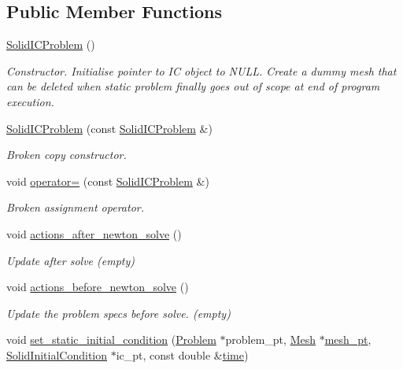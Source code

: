 \subsection*{Public Member Functions}
\begin{DoxyCompactItemize}
\item 
\hyperlink{classoomph_1_1SolidICProblem_ae1dd84a4e5df9eb444dd82531847ab79}{Solid\+I\+C\+Problem} ()
\begin{DoxyCompactList}\small\item\em Constructor. Initialise pointer to IC object to N\+U\+LL. Create a dummy mesh that can be deleted when static problem finally goes out of scope at end of program execution. \end{DoxyCompactList}\item 
\hyperlink{classoomph_1_1SolidICProblem_a2f8924f554988e4c9bb98281231f9767}{Solid\+I\+C\+Problem} (const \hyperlink{classoomph_1_1SolidICProblem}{Solid\+I\+C\+Problem} \&)
\begin{DoxyCompactList}\small\item\em Broken copy constructor. \end{DoxyCompactList}\item 
void \hyperlink{classoomph_1_1SolidICProblem_a109d2237cf87ebf19793e5088f89761f}{operator=} (const \hyperlink{classoomph_1_1SolidICProblem}{Solid\+I\+C\+Problem} \&)
\begin{DoxyCompactList}\small\item\em Broken assignment operator. \end{DoxyCompactList}\item 
void \hyperlink{classoomph_1_1SolidICProblem_afef1ae777a009afd2329dcb091862f69}{actions\+\_\+after\+\_\+newton\+\_\+solve} ()
\begin{DoxyCompactList}\small\item\em Update after solve (empty) \end{DoxyCompactList}\item 
void \hyperlink{classoomph_1_1SolidICProblem_ad234d3268b330cd2f532548103cb60fc}{actions\+\_\+before\+\_\+newton\+\_\+solve} ()
\begin{DoxyCompactList}\small\item\em Update the problem specs before solve. (empty) \end{DoxyCompactList}\item 
void \hyperlink{classoomph_1_1SolidICProblem_a60e1dccbc8627a07bfcb38a55b0669ca}{set\+\_\+static\+\_\+initial\+\_\+condition} (\hyperlink{classoomph_1_1Problem}{Problem} $\ast$problem\+\_\+pt, \hyperlink{classoomph_1_1Mesh}{Mesh} $\ast$\hyperlink{classoomph_1_1Problem_aad122d70a22dc5302cfd5853d3cf3057}{mesh\+\_\+pt}, \hyperlink{classoomph_1_1SolidInitialCondition}{Solid\+Initial\+Condition} $\ast$ic\+\_\+pt, const double \&\hyperlink{classoomph_1_1Problem_acd8c357349d20a28af70b2b7ea7f488d}{time})

\end{DoxyCompactItemize}
